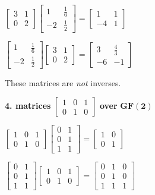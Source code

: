 \documentclass[
  letterpaper,
  DIV=11,
  numbers=noendperiod]{scrartcl}
\begin{document}
\(\begin{bmatrix}3 &1\\0 &2\end{bmatrix} \begin{bmatrix}1 &\frac{1}{6}\\-2 &\frac{1}{2}\end{bmatrix} = \begin{bmatrix}1 &1\\-4 &1\end{bmatrix}\)

\(\begin{bmatrix}1 &\frac{1}{6}\\-2 &\frac{1}{2}\end{bmatrix} \begin{bmatrix}3 &1\\0 &2\end{bmatrix} = \begin{bmatrix}3 &\frac{4}{3}\\-6 &-1\end{bmatrix}\)

These matrices are \emph{not} inverses.

\textbf{4. matrices}
\(\begin{bmatrix} 1 & 0 & 1 \\ 0 & 1 & 0 \end{bmatrix}\) \textbf{over}
\(\bm{GF(2)}\)

\(\begin{bmatrix}1 &0 &1\\0 &1 &0\end{bmatrix} \begin{bmatrix}0 &1\\0 &1\\1 &1\end{bmatrix} = \begin{bmatrix}1 &0\\0 &1\end{bmatrix}\)

\(\begin{bmatrix}0 &1\\0 &1\\1 &1\end{bmatrix} \begin{bmatrix}1 &0 &1\\0 &1 &0\end{bmatrix} = \begin{bmatrix}0 &1 &0\\0 &1 &0\\1 &1 &1\end{bmatrix}\)
\end{document}
